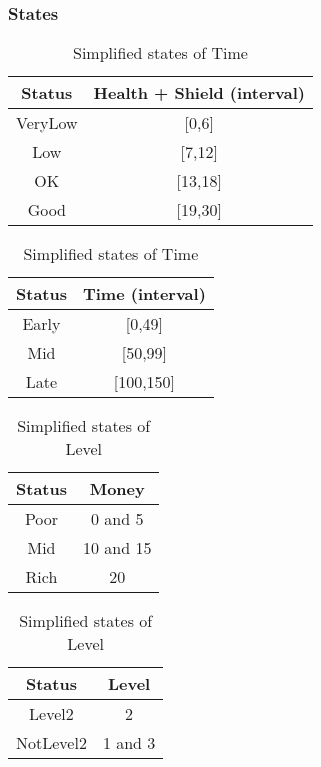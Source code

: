 \documentclass{article}
\begin{document}
  \subsubsection{States}
  \begin{table}[h!]
      \parbox{.45\linewidth}{
        \centering
        \caption{Simplified states of Health}
        \label{tab:tableA*1}
        \begin{tabular}{c|c}
          \textbf{Status} & \textbf{Health + Shield (interval)}\\
          \hline
          VeryLow & [0,6]\\
          Low & [7,12]\\
          OK & [13,18]\\
          Good & [19,30]\\
        \end{tabular}
      }
      \hfil
      \parbox{.45\linewidth}{
        \centering
        \caption{Simplified states of Time}
        \label{tab:tableA*2}
        \begin{tabular}{c|c}
          \textbf{Status} & \textbf{Time (interval)}\\
          \hline
          Early  & [0,49]\\
          Mid & [50,99]\\
          Late & [100,150]\\
        \end{tabular}
      }
  \end{table}
  \begin{table}[h!]
    \parbox{.45\linewidth}{
      \centering
      \caption{Simplified states of Money}
      \label{tab:tableA*3}
      \begin{tabular}{c|c}
        \textbf{Status} & \textbf{Money}\\
        \hline
        Poor & 0 and 5\\
        Mid & 10 and 15\\
        Rich & 20\\
      \end{tabular}
    }
    \hfil
    \parbox{.45\linewidth}{
      \centering
      \caption{Simplified states of Level}
      \label{tab:tableA*4}
      \begin{tabular}{c|c}
        \textbf{Status} & \textbf{Level}\\
        \hline
        Level2 & 2\\
        NotLevel2 & 1 and 3\\
      \end{tabular}
    }
  \end{table}
\end{document}
